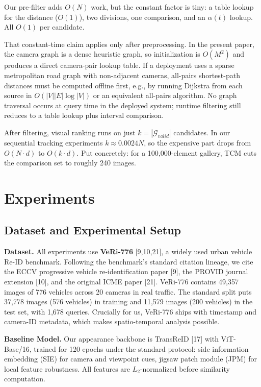 \documentclass{ijitcs}
\newcommand{\rev}[1]{#1}
\begin{document}
Our pre-filter adds $O(N)$ work, but the constant factor is tiny: a table lookup for the distance ($O(1)$), two divisions, one comparison, and an $\alpha(t)$ lookup. All $O(1)$ per candidate.

\rev{That constant-time claim applies only after preprocessing. In the present paper, the camera graph is a dense heuristic graph, so initialization is $O(M^2)$ and produces a direct camera-pair lookup table. If a deployment uses a sparse metropolitan road graph with non-adjacent cameras, all-pairs shortest-path distances must be computed offline first, e.g., by running Dijkstra from each source in $O(|V||E|\log|V|)$ or an equivalent all-pairs algorithm. No graph traversal occurs at query time in the deployed system; runtime filtering still reduces to a table lookup plus interval comparison.}

After filtering, visual ranking runs on just $k = |\mathcal{G}_{valid}|$ candidates. In our sequential tracking experiments $k \approx 0.0024N$, so the expensive part drops from $O(N \cdot d)$ to $O(k \cdot d)$. Put concretely: for a 100{,}000-element gallery, TCM cuts the comparison set to roughly 240 images.


\section{Experiments}

\subsection{Dataset and Experimental Setup}
\textbf{Dataset.} All experiments use \textbf{VeRi-776} [9,10,21], a widely used urban vehicle Re-ID benchmark. \rev{Following the benchmark's standard citation lineage, we cite the ECCV progressive vehicle re-identification paper [9], the PROVID journal extension [10], and the original ICME paper [21].} VeRi-776 contains 49,357 images of 776 vehicles across 20 cameras in real traffic. The standard split puts 37,778 images (576 vehicles) in training and 11,579 images (200 vehicles) in the test set, with 1,678 queries. Crucially for us, VeRi-776 ships with timestamp and camera-ID metadata, which makes spatio-temporal analysis possible.

\textbf{Baseline Model.} Our appearance backbone is TransReID [17] with ViT-Base/16, trained for 120 epochs under the standard protocol: side information embedding (SIE) for camera and viewpoint cues, jigsaw patch module (JPM) for local feature robustness. All features are $L_2$-normalized before similarity computation.
\end{document}

